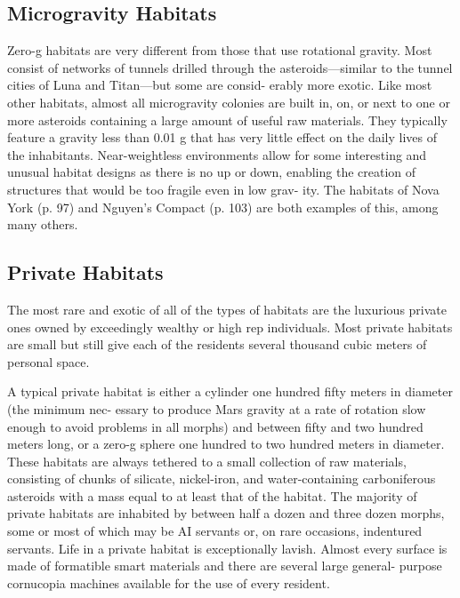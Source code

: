 \subsection{Microgravity Habitats}

Zero-g habitats are very different from those that 
use rotational gravity. Most consist of networks of 
tunnels drilled through the asteroids—similar to the 
tunnel cities of Luna and Titan—but some are consid-
erably more exotic. Like most other habitats, almost 
all microgravity colonies are built in, on, or next to 
one or more asteroids containing a large amount of 
useful raw materials. They typically feature a gravity 
less than 0.01 g that has very little effect on the daily 
lives of the inhabitants. Near-weightless environments 
allow for some interesting and unusual habitat designs 
as there is no up or down, enabling the creation of 
structures that would be too fragile even in low grav-
ity. The habitats of Nova York (p. 97) and Nguyen's 
Compact (p. 103) are both examples of this, among 
many others.

\subsection{Private Habitats}

The most rare and exotic of all of the types of habitats 
are the luxurious private ones owned by exceedingly 
wealthy or high rep individuals. Most private habitats 
are small but still give each of the residents several 
thousand cubic meters of personal space.

A typical private habitat is either a cylinder one 
hundred fifty meters in diameter (the minimum nec-
essary to produce Mars gravity at a rate of rotation 
slow enough to avoid problems in all morphs) and 
between fifty and two hundred meters long, or a 
zero-g sphere one hundred to two hundred meters 
in diameter. These habitats are always tethered to 
a small collection of raw materials, consisting of 
chunks of silicate, nickel-iron, and water-containing 
carboniferous asteroids with a mass equal to at 
least that of the habitat. The majority of private 
habitats are inhabited by between half a dozen and 
three dozen morphs, some or most of which may 
be AI servants or, on rare occasions, indentured 
servants. Life in a private habitat is exceptionally 
lavish. Almost every surface is made of formatible 
smart materials and there are several large general-
purpose cornucopia machines available for the use 
of every resident.

